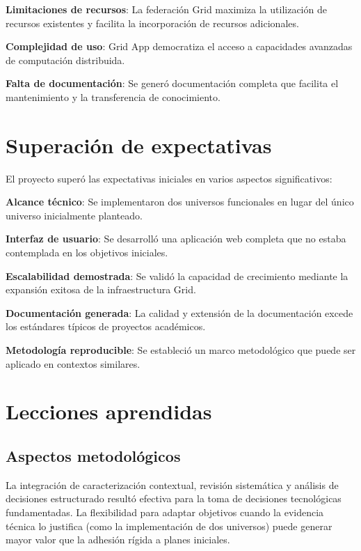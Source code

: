\textbf{Limitaciones de recursos}: La federación Grid maximiza la utilización de recursos existentes y facilita la incorporación de recursos adicionales.

\textbf{Complejidad de uso}: Grid App democratiza el acceso a capacidades avanzadas de computación distribuida.

\textbf{Falta de documentación}: Se generó documentación completa que facilita el mantenimiento y la transferencia de conocimiento.

\section{Superación de expectativas}
\noindent

El proyecto superó las expectativas iniciales en varios aspectos significativos:

\textbf{Alcance técnico}: Se implementaron dos universos funcionales en lugar del único universo inicialmente planteado.

\textbf{Interfaz de usuario}: Se desarrolló una aplicación web completa que no estaba contemplada en los objetivos iniciales.

\textbf{Escalabilidad demostrada}: Se validó la capacidad de crecimiento mediante la expansión exitosa de la infraestructura Grid.

\textbf{Documentación generada}: La calidad y extensión de la documentación excede los estándares típicos de proyectos académicos.

\textbf{Metodología reproducible}: Se estableció un marco metodológico que puede ser aplicado en contextos similares.

\section{Lecciones aprendidas}
\noindent

\subsection{Aspectos metodológicos}
\noindent

La integración de caracterización contextual, revisión sistemática y análisis de decisiones estructurado resultó efectiva para la toma de decisiones tecnológicas fundamentadas. La flexibilidad para adaptar objetivos cuando la evidencia técnica lo justifica (como la implementación de dos universos) puede generar mayor valor que la adhesión rígida a planes iniciales.

